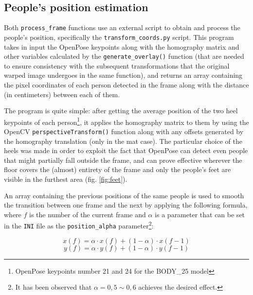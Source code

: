 \documentclass[12pt]{article}
\begin{document}

\subsection{People’s position estimation}
\label{chap:position}

Both \lstinline{process_frame} functions use an external script to obtain and process the people’s position, specifically the \lstinline{transform_coords.py} script. This program takes in input the OpenPose keypoints along with the homography matrix and other variables calculated by the \lstinline{generate_overlay()} function (that are needed to ensure consistency with the subsequent transformations that the original warped image undergoes in the same function), and returns an array containing the pixel coordinates of each person detected in the frame along with the distance (in centimeters) between each of them.

The program is quite simple: after getting the average position of the two heel keypoints of each person\footnote{OpenPose keypoints number 21 and 24 for the BODY\_25 model\cite{opkp}}, it applies the homography matrix to them by using the OpenCV \lstinline{perspectiveTransform()}\cite{cvpertrans} function along with any offsets generated by the homography translation (only in the mat case). The particular choice of the heels was made in order to exploit the fact that OpenPose can detect even people that might partially fall outside the frame, and can prove effective wherever the floor covers the (almost) entirety of the frame and only the people’s feet are visible in the furthest area (fig. \ref{fig:feet}).

An array containing the previous positions of the same people is used to smooth the transition between one frame and the next by applying the following formula, where $f$ is the number of the current frame and $\alpha$ is a parameter that can be set in the \lstinline{INI} file as the \lstinline{position_alpha} parameter\footnote{It has been observed that $\alpha = 0,5 \sim 0,6$ achieves the desired effect.}:

\begin{equation}
x(f) = \alpha \cdot x(f) + (1-\alpha) \cdot x(f-1)
\label{eq:weightx}
\end{equation}
\begin{equation}
y(f) = \alpha \cdot y(f) + (1-\alpha) \cdot y(f-1)
\label{eq:weighty}
\end{equation}
\end{document}
